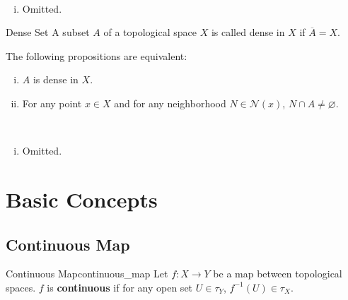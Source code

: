 \documentclass{report}
\begin{document}
\begin{prf}~\\ \vspace{-1em}
	\begin{enumerate}[(i)]
		\item Omitted.
	\end{enumerate}
\end{prf}


\begin{definition}{Dense Set}{}
	A subset $A$ of a topological space $X$ is called dense in $X$ if  $\overline{A}=X$.
\end{definition}

\begin{proposition}{}{}
	The following propositions are equivalent:
	\begin{enumerate}[(i)]
		\item $A$ is dense in $X$.
		\item For any point $x \in X$ and for any neighborhood $N\in\mathcal{N}(x)$, $N\cap A\ne \varnothing$.
	\end{enumerate}
\end{proposition}

\begin{prf}~\\ \vspace{-1em}
	\begin{enumerate}[(i)]
		\item Omitted.
	\end{enumerate}
\end{prf}


\section{Basic Concepts}
\subsection{Continuous Map}

\begin{definition}{Continuous Map}{continuous_map}
	Let $f:X\to Y$ be a map between topological spaces. $f$ is \textbf{continuous} if for any open set $U\in\tau_Y$, $f^{-1}(U)\in\tau_X$.
\end{definition}
\end{document}
